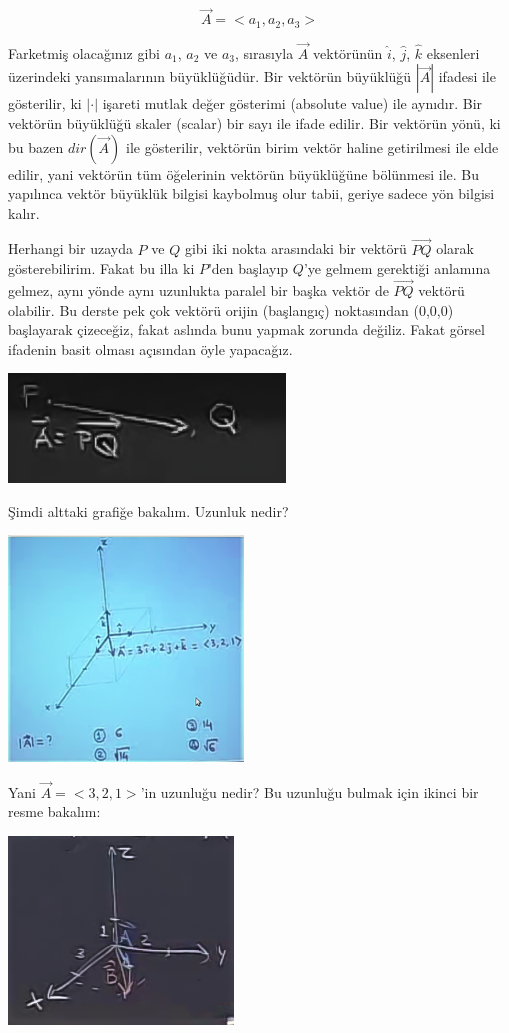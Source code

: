 \documentclass[12pt,fleqn]{article}\usepackage{../../common}
\begin{document}
$$ \vec{A} = < a_1, a_2, a_3 > $$

Farketmiş olacağınız gibi $a_1$, $a_2$ ve $a_3$, sırasıyla $ \vec{A} $
vektörünün $\hat{i}$, $\hat{j}$, $\hat{k}$ eksenleri üzerindeki yansımalarının
büyüklüğüdür. Bir vektörün büyüklüğü $|\vec{A}|$ ifadesi ile gösterilir, ki
$|\cdot|$ işareti mutlak değer gösterimi (absolute value) ile aynıdır. Bir
vektörün büyüklüğü skaler (scalar) bir sayı ile ifade edilir. Bir vektörün yönü,
ki bu bazen $dir(\vec{A})$ ile gösterilir, vektörün birim vektör haline
getirilmesi ile elde edilir, yani vektörün tüm öğelerinin vektörün büyüklüğüne
bölünmesi ile. Bu yapılınca vektör büyüklük bilgisi kaybolmuş olur tabii, geriye
sadece yön bilgisi kalır.

Herhangi bir uzayda $P$ ve $Q$ gibi iki nokta arasındaki bir vektörü $\vec{PQ}$
olarak gösterebilirim. Fakat bu illa ki $P$'den başlayıp $Q$'ye gelmem gerektiği
anlamına gelmez, aynı yönde aynı uzunlukta paralel bir başka vektör de
$\vec{PQ}$ vektörü olabilir. Bu derste pek çok vektörü orijin (başlangıç)
noktasından (0,0,0) başlayarak çizeceğiz, fakat aslında bunu yapmak zorunda
değiliz. Fakat görsel ifadenin basit olması açısından öyle yapacağız.

\includegraphics[height=2.9cm]{1_2.png}

Şimdi alttaki grafiğe bakalım. Uzunluk nedir?

\includegraphics[height=6cm]{1_3.png}

Yani $\vec{A} = <3,2,1>$'in uzunluğu nedir?  Bu uzunluğu bulmak için ikinci bir
resme bakalım:

\includegraphics[height=5cm]{1_4.png}
\end{document}
